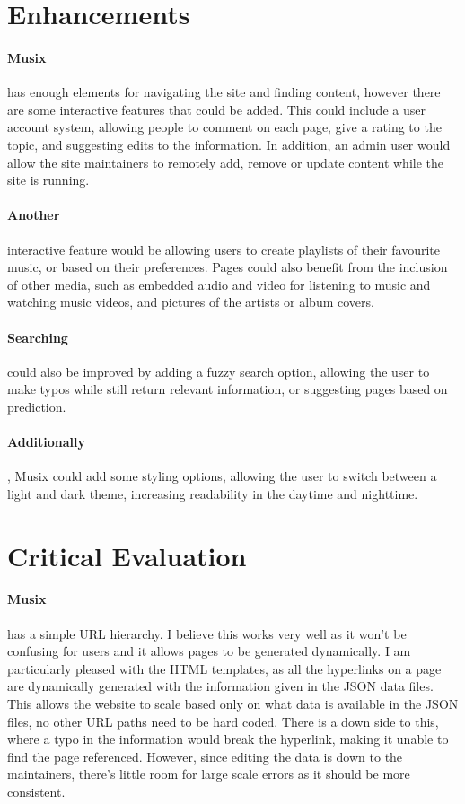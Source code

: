 \documentclass[10pt, a4paper]{article}
\begin{document}
    \section{Enhancements}
    \paragraph{Musix} has enough elements for navigating the site and finding content, however there are some interactive features that could be added. This could include a user account system, allowing people to comment on each page, give a rating to the topic, and suggesting edits to the information. In addition, an admin user would allow the site maintainers to remotely add, remove or update content while the site is running.
    \paragraph{Another} interactive feature would be allowing users to create playlists of their favourite music, or based on their preferences. Pages could also benefit from the inclusion of other media, such as embedded audio and video for listening to music and watching music videos, and pictures of the artists or album covers.
    \paragraph{Searching} could also be improved by adding a fuzzy search option, allowing the user to make typos while still return relevant information, or suggesting pages based on prediction.
    \paragraph{Additionally}, Musix could add some styling options, allowing the user to switch between a light and dark theme, increasing readability in the daytime and nighttime.
    
    \section{Critical Evaluation}
    \paragraph{Musix} has a simple URL hierarchy. I believe this works very well as it won't be confusing for users and it allows pages to be generated dynamically. I am particularly pleased with the HTML templates, as all the hyperlinks on a page are dynamically generated with the information given in the JSON data files. This allows the website to scale based only on what data is available in the JSON files, no other URL paths need to be hard coded. There is a down side to this, where a typo in the information would break the hyperlink, making it unable to find the page referenced. However, since editing the data is down to the maintainers, there's little room for large scale errors as it should be more consistent.
\end{document}
